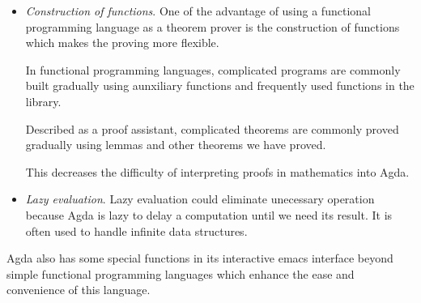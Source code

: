 \begin{itemize}
\item \textit{Construction of functions}. One of the advantage of using a functional programming language as a theorem prover is the construction of functions which makes the proving more flexible.

In functional programming languages, complicated programs are commonly built gradually using aunxiliary functions and frequently used functions in the library.

Described as a proof assistant, complicated theorems are commonly proved gradually using lemmas and other theorems we have proved.

This decreases the difficulty of interpreting proofs in mathematics into Agda.

\item \textit{Lazy evaluation}. Lazy evaluation could eliminate unecessary operation because Agda is lazy to delay a computation until we need its result. It is often used to handle infinite data structures. \cite{wiki:Lazy_evaluation}

\end{itemize}

Agda also has some special functions in its interactive emacs interface beyond simple functional programming languages which enhance the ease and convenience of this language.

